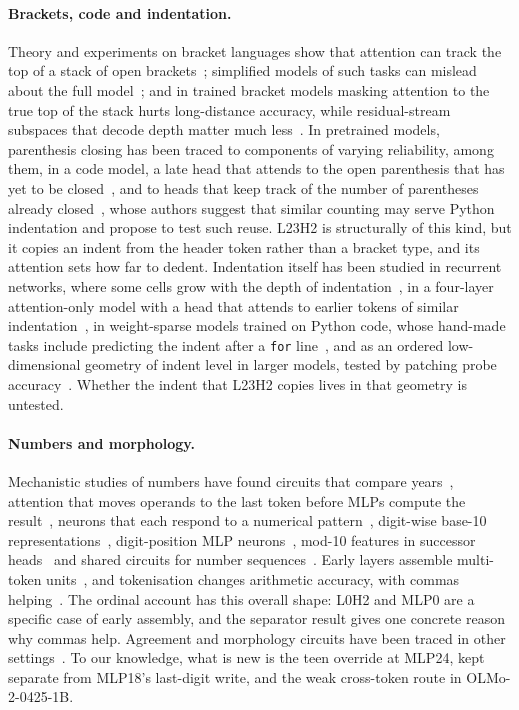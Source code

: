\documentclass[11pt]{article}
\newcommand{\hd}[2]{L#1H#2}
\newcommand{\mlp}[1]{MLP#1}
\newcommand{\code}[1]{\texttt{#1}}
\newcommand{\olmo}{OLMo-2-0425-1B}
\begin{document}
\paragraph{Brackets, code and indentation.} Theory and experiments on bracket languages show that attention can track the top of a stack of open brackets~\citep{ebrahimi2020dyck,yao2021bounded}; simplified models of such tasks can mislead about the full model~\citep{friedman2024illusions}; and in trained bracket models masking attention to the true top of the stack hurts long-distance accuracy, while residual-stream subspaces that decode depth matter much less~\citep{sharma2026dyck}. In pretrained models, parenthesis closing has been traced to components of varying reliability, among them, in a code model, a late head that attends to the open parenthesis that has yet to be closed~\citep{rai2025interference}, and to heads that keep track of the number of parentheses already closed~\citep{miller2025codecompletion}, whose authors suggest that similar counting may serve Python indentation and propose to test such reuse. \hd{23}{2} is structurally of this kind, but it copies an indent from the header token rather than a bracket type, and its attention sets how far to dedent. Indentation itself has been studied in recurrent networks, where some cells grow with the depth of indentation~\citep{karpathy2015visualizing}, in a four-layer attention-only model with a head that attends to earlier tokens of similar indentation~\citep{janiak2023polysemantic}, in weight-sparse models trained on Python code, whose hand-made tasks include predicting the indent after a \code{for} line~\citep{gao2025weightsparse}, and as an ordered low-dimensional geometry of indent level in larger models, tested by patching probe accuracy~\citep{bassi2026geometry}. Whether the indent that \hd{23}{2} copies lives in that geometry is untested.

\paragraph{Numbers and morphology.} Mechanistic studies of numbers have found circuits that compare years~\citep{hanna2023greaterthan}, attention that moves operands to the last token before MLPs compute the result~\citep{stolfo2023arithmetic}, neurons that each respond to a numerical pattern~\citep{nikankin2025heuristics}, digit-wise base-10 representations~\citep{levy2025digits}, digit-position MLP neurons~\citep{baeumel2025modular}, mod-10 features in successor heads~\citep{gould2024successor} and shared circuits for number sequences~\citep{lan2024sequence}. Early layers assemble multi-token units~\citep{feucht2024erasure,lad2024stages}, and tokenisation changes arithmetic accuracy, with commas helping~\citep{singh2024tokenization}. The ordinal account has this overall shape: \hd{0}{2} and \mlp{0} are a specific case of early assembly, and the separator result gives one concrete reason why commas help. Agreement and morphology circuits have been traced in other settings~\citep{finlayson2021agreement,ferrando2024agreement}. To our knowledge, what is new is the teen override at \mlp{24}, kept separate from \mlp{18}'s last-digit write, and the weak cross-token route in \olmo{}.
\end{document}
